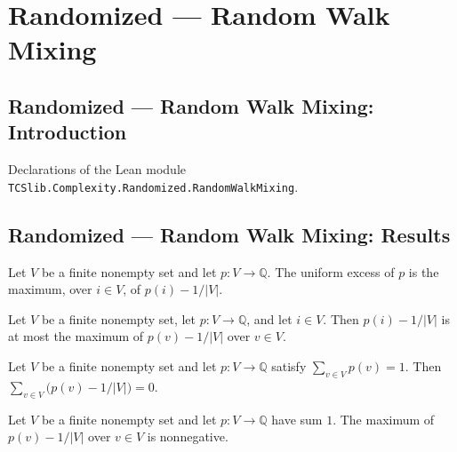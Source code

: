 \section{Randomized --- Random Walk Mixing}
\subsection*{Randomized --- Random Walk Mixing: Introduction}

Declarations of the Lean module \texttt{TCSlib.Complexity.Randomized.RandomWalkMixing}.

\subsection*{Randomized --- Random Walk Mixing: Results}

\begin{definition}
\label{Randomized.uniformExcess}
\leanok
Let $V$ be a finite nonempty set and let $p:V\to\mathbb{Q}$. The uniform excess of $p$
is the maximum, over $i\in V$, of $p(i)-1/|V|$.
\end{definition}

\begin{theorem}
\label{Randomized.le_uniformExcess}
\leanok
{}
Let $V$ be a finite nonempty set, let $p:V\to\mathbb{Q}$, and let $i\in V$. Then
$p(i)-1/|V|$ is at most the maximum of $p(v)-1/|V|$ over $v\in V$.
\end{theorem}

\begin{theorem}
\label{Randomized.sum_sub_inv_card}
\leanok
{}
Let $V$ be a finite nonempty set and let $p:V\to\mathbb{Q}$ satisfy $\sum_{v\in
V}p(v)=1$. Then $\sum_{v\in V}\bigl(p(v)-1/|V|\bigr)=0$.
\end{theorem}

\begin{theorem}
\label{Randomized.uniformExcess_nonneg}
\leanok
{}
Let $V$ be a finite nonempty set and let $p:V\to\mathbb{Q}$ have sum $1$. The maximum of
$p(v)-1/|V|$ over $v\in V$ is nonnegative.
\end{theorem}

